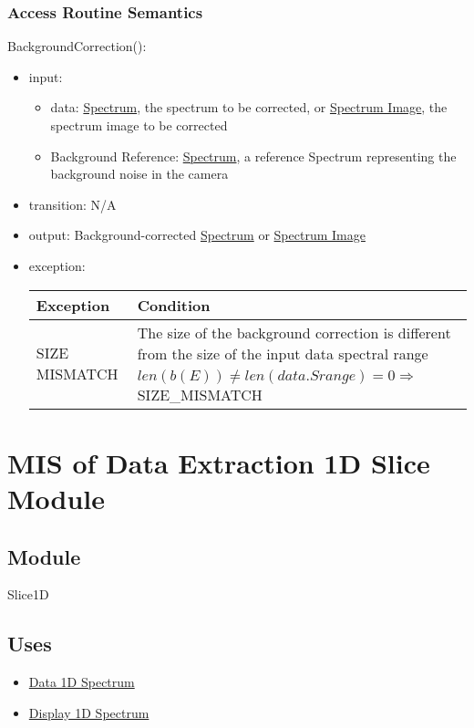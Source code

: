 \documentclass[12pt, titlepage]{article}
\begin{document}
\subsubsection{Access Routine Semantics}
\noindent BackgroundCorrection():
\begin{itemize}
    \item input: 
    \begin{itemize}
        \item data: \hyperref[Mod:Spectrum]{Spectrum}, the spectrum to be
        corrected, or \hyperref[Mod:SI]{Spectrum Image}, the spectrum image to be
        corrected
        \item Background Reference: \hyperref[Mod:Spectrum]{Spectrum}, a
        reference Spectrum representing the background noise in the camera
    \end{itemize}
    \item transition: N/A
    \item output: Background-corrected \hyperref[Mod:Spectrum]{Spectrum} or
    \hyperref[Mod:SI]{Spectrum Image}
    \item exception:
    \begin{center}
        \begin{tabular}{p{3.5cm} p{12cm}}
            \toprule[0.15em]
            \textbf{Exception} & \textbf{Condition}\\
            \midrule[0.1em]
            \multirow{2}{0.25\textwidth}{SIZE MISMATCH} & The size of the
            background correction is different from the size of the input data spectral
            range\\ 
            & $len(b(E)) \neq len(data.Srange) = 0 \Rightarrow$ SIZE\_MISMATCH\\
            
            \bottomrule[0.15em]
        \end{tabular}
    \end{center}
\end{itemize}


\section{MIS of Data Extraction 1D Slice Module} \label{Mod:Slice1D}

\subsection{Module}
Slice1D

\subsection{Uses}
\begin{itemize}
    \item \hyperref[Mod:Spectrum]{Data 1D Spectrum}
    \item \hyperref[Mod:Disp1D]{Display 1D Spectrum}
\end{itemize}
\end{document}
